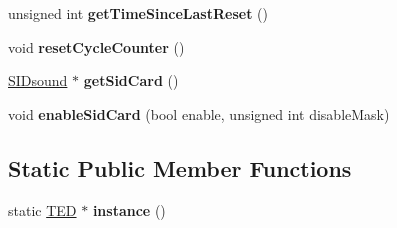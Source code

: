 \begin{DoxyCompactItemize}
\item 
\mbox{\label{class_t_e_d_ad2d01439e304042d6451281d94d72e1e}} 
unsigned int {\bfseries get\+Time\+Since\+Last\+Reset} ()
\item 
\mbox{\label{class_t_e_d_a9a57c04b09a629a23656628f294a59f5}} 
void {\bfseries reset\+Cycle\+Counter} ()
\item 
\mbox{\label{class_t_e_d_a5444899231eee40ba61cfbb64a03a740}} 
\mbox{\hyperlink{class_s_i_dsound}{S\+I\+Dsound}} $\ast$ {\bfseries get\+Sid\+Card} ()
\item 
\mbox{\label{class_t_e_d_aefd0ed19326901e05794db625f383ca4}} 
void {\bfseries enable\+Sid\+Card} (bool enable, unsigned int disable\+Mask)
\end{DoxyCompactItemize}
\subsection*{Static Public Member Functions}
\begin{DoxyCompactItemize}
\item 
\mbox{\label{class_t_e_d_a79b51d09ec4669a330f344e5d5ed69e7}} 
static \mbox{\hyperlink{class_t_e_d}{T\+ED}} $\ast$ {\bfseries instance} ()
\end{DoxyCompactItemize}
